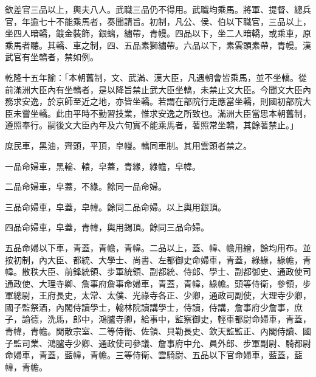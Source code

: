 \begin{pinyinscope}
欽差官三品以上，輿夫八人。武職三品仍不得用。武職均乘馬。將軍、提督、總兵官，年逾七十不能乘馬者，奏聞請旨。初制，凡公、侯、伯以下職官，三品以上，坐四人暗轎，鍍金裝飾，銀螭，繡帶，青幔。四品以下，坐二人暗轎，或乘車，原乘馬者聽。其轎、車之制，四、五品素獅繡帶。六品以下，素雲頭素帶，青幔。漢武官有坐轎者，禁如例。

乾隆十五年諭：「本朝舊制，文、武滿、漢大臣，凡遇朝會皆乘馬，並不坐轎。從前滿洲大臣內有坐轎者，是以降旨禁止武大臣坐轎，未禁止文大臣。今聞文大臣內務求安逸，於京師至近之地，亦皆坐轎。若謂在部院行走應當坐轎，則國初部院大臣未嘗坐轎。此由平時不勤習技業，惟求安逸之所致也。滿洲大臣當思本朝舊制，遵照奉行。嗣後文大臣內年及六旬實不能乘馬者，著照常坐轎，其餘著禁止。」

庶民車，黑油，齊頭，平頂，皁幔。轎同車制。其用雲頭者禁之。

一品命婦車，黑輪、轅，皁蓋，青緣，綠幨，皁幃。

二品命婦車，皁蓋，不緣。餘同一品命婦。

三品命婦車，皁蓋，皁幃。餘同二品命婦。以上輿用銀頂。

四品命婦車，皁蓋，青幃，輿用錫頂。餘同三品命婦。

五品命婦以下車，青蓋，青幨，青幃。二品以上，蓋、幃、幨用繒，餘均用布。並按初制，內大臣、都統、大學士、尚書、左都御史命婦車，青蓋，綠緣，綠幨，青幃。散秩大臣、前鋒統領、步軍統領、副都統、侍郎、學士、副都御史、通政使司通政使、大理寺卿、詹事府詹事命婦車，青蓋，青幃，綠幨。頭等侍衛，參領，步軍總尉，王府長史，太常、太僕、光祿寺各正、少卿，通政司副使，大理寺少卿，國子監祭酒，內閣侍讀學士，翰林院讀講學士，侍讀，侍講，詹事府少詹事，庶子，諭德，洗馬，郎中，鴻臚寺卿，給事中，監察御史，輕車都尉命婦車，青蓋，青幃，青幨。閒散宗室、二等侍衛、佐領、貝勒長史、欽天監監正、內閣侍讀、國子監司業、鴻臚寺少卿、通政使司參議、詹事府中允、員外郎、步軍副尉、騎都尉命婦車，青蓋，藍幃，青幨。三等侍衛、雲騎尉、五品以下官命婦車，藍蓋，藍幃，青幨。


\end{pinyinscope}